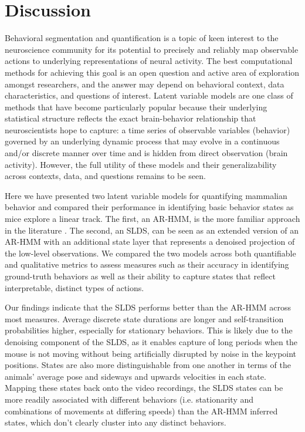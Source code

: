 \section{Discussion}
\label{sec:slds:discussion}

Behavioral segmentation and quantification is a topic of keen interest to the neuroscience community for its potential to precisely and reliably map observable actions to underlying representations of neural activity. The best computational methods for achieving this goal is an open question and active area of exploration amongst researchers, and the answer may depend on behavioral context, data characteristics, and questions of interest. Latent variable models are one class of methods that have become particularly popular because their underlying statistical structure reflects the exact brain-behavior relationship that neuroscientists hope to capture: a time series of observable variables (behavior) governed by an underlying dynamic process that may evolve in a continuous and/or discrete manner over time and is hidden from direct observation (brain activity). However, the full utility of these models and their generalizability across contexts, data, and questions remains to be seen.  

Here we have presented two latent variable models for quantifying mammalian behavior and compared their performance in identifying basic behavior states as mice explore a linear track. The first, an AR-HMM, is the more familiar approach in the literature \cite{wiltschko_mapping_2015, markowitz_striatum_2018, wiltschko_revealing_2020, costacurta_distinguishing_2022}. The second, an SLDS, can be seen as an extended version of an AR-HMM with an additional state layer that represents a denoised projection of the low-level observations. We compared the two models across both quantifiable and qualitative metrics to assess measures such as their accuracy in identifying ground-truth behaviors as well as their ability to capture states that reflect interpretable, distinct types of actions. 

Our findings indicate that the SLDS performs better than the AR-HMM across most measures. Average discrete state durations are longer and self-transition probabilities higher, especially for stationary behaviors. This is likely due to the denoising component of the SLDS, as it enables capture of long periods when the mouse is not moving without being artificially disrupted by noise in the keypoint positions. States are also more distinguishable from one another in terms of the animals' average pose and sideways and upwards velocities in each state. Mapping these states back onto the video recordings, the SLDS states can be more readily associated with different behaviors (i.e. stationarity and combinations of movements at differing speeds) than the AR-HMM inferred states, which don't clearly cluster into any distinct behaviors. 

